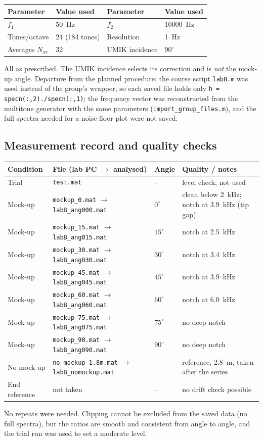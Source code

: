 \documentclass[a4paper,10pt]{article}
\newcommand{\file}[1]{\nolinkurl{#1}}
\begin{document}
\par\smallskip
\begin{tabularx}{\linewidth}{@{}lXlX@{}}\toprule
Parameter & Value used & Parameter & Value used \\\midrule
$f_1$ & \SI{50}{\hertz} & $f_2$ & \SI{10000}{\hertz} \\
Tones/octave & 24 (184 tones) & Resolution & \SI{1}{\hertz} \\
Averages $N_{\mathrm{av}}$ & 32 & UMIK incidence & $90^\circ$ \\\bottomrule
\end{tabularx}\par\smallskip
All as prescribed. The UMIK incidence selects its correction and is \emph{not} the
mock-up angle. Departure from the planned procedure: the course script \file{labB.m}
was used instead of the group's wrapper, so each saved file holds only
\file{h = specn(:,2)./specn(:,1)}; the frequency vector was reconstructed from the
multitone generator with the same parameters (\file{import_group_files.m}), and the
full spectra needed for a noise-floor plot were not saved.

\newpage
\subsection{Measurement record and quality checks}
\par\smallskip
\begin{tabularx}{\linewidth}{@{}lXlX@{}}\toprule
Condition & File (lab PC $\to$ analysed) & Angle & Quality / notes \\\midrule
Trial & \file{test.mat} & -- & level check, not used \\
Mock-up & \file{mockup_0.mat} $\to$ \file{labB_ang000.mat} & $0^\circ$ & clean below \SI{2}{kHz}; notch at \SI{3.9}{kHz} (tip gap) \\
Mock-up & \file{mockup_15.mat} $\to$ \file{labB_ang015.mat} & $15^\circ$ & notch at \SI{2.5}{kHz} \\
Mock-up & \file{mockup_30.mat} $\to$ \file{labB_ang030.mat} & $30^\circ$ & notch at \SI{3.4}{kHz} \\
Mock-up & \file{mockup_45.mat} $\to$ \file{labB_ang045.mat} & $45^\circ$ & notch at \SI{3.9}{kHz} \\
Mock-up & \file{mockup_60.mat} $\to$ \file{labB_ang060.mat} & $60^\circ$ & notch at \SI{6.0}{kHz} \\
Mock-up & \file{mockup_75.mat} $\to$ \file{labB_ang075.mat} & $75^\circ$ & no deep notch \\
Mock-up & \file{mockup_90.mat} $\to$ \file{labB_ang090.mat} & $90^\circ$ & no deep notch \\
No mock-up & \file{no_mockup_1.8m.mat} $\to$ \file{labB_nomockup.mat} & -- & reference, \SI{2.8}{m}, taken after the series \\
End reference & not taken & -- & no drift check possible \\\bottomrule
\end{tabularx}\par\smallskip
No repeats were needed. Clipping cannot be excluded from the saved data (no full
spectra), but the ratios are smooth and consistent from angle to angle, and the trial
run was used to set a moderate level.
\end{document}
